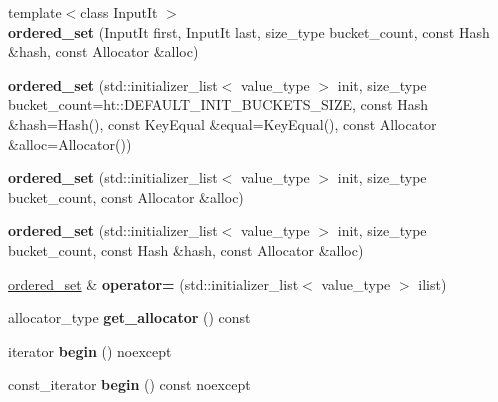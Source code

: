 \begin{DoxyCompactItemize}
{\footnotesize template$<$class Input\+It $>$ }\\{\bfseries ordered\+\_\+set} (Input\+It first, Input\+It last, size\+\_\+type bucket\+\_\+count, const Hash \&hash, const Allocator \&alloc)
\item 
\mbox{\label{classtsl_1_1ordered__set_af15847bafa2827f9558ff3113ce3c047}} 
{\bfseries ordered\+\_\+set} (std\+::initializer\+\_\+list$<$ value\+\_\+type $>$ init, size\+\_\+type bucket\+\_\+count=ht\+::\+D\+E\+F\+A\+U\+L\+T\+\_\+\+I\+N\+I\+T\+\_\+\+B\+U\+C\+K\+E\+T\+S\+\_\+\+S\+I\+ZE, const Hash \&hash=Hash(), const Key\+Equal \&equal=Key\+Equal(), const Allocator \&alloc=Allocator())
\item 
\mbox{\label{classtsl_1_1ordered__set_a3756674af513e07365ea58a4307ea068}} 
{\bfseries ordered\+\_\+set} (std\+::initializer\+\_\+list$<$ value\+\_\+type $>$ init, size\+\_\+type bucket\+\_\+count, const Allocator \&alloc)
\item 
\mbox{\label{classtsl_1_1ordered__set_a4ada7c8348ee664b0c8d51c241ce3c82}} 
{\bfseries ordered\+\_\+set} (std\+::initializer\+\_\+list$<$ value\+\_\+type $>$ init, size\+\_\+type bucket\+\_\+count, const Hash \&hash, const Allocator \&alloc)
\item 
\mbox{\label{classtsl_1_1ordered__set_a4e545a2e1c9252da9aafd3b8d9027996}} 
\mbox{\hyperlink{classtsl_1_1ordered__set}{ordered\+\_\+set}} \& {\bfseries operator=} (std\+::initializer\+\_\+list$<$ value\+\_\+type $>$ ilist)
\item 
\mbox{\label{classtsl_1_1ordered__set_a43ee92e0575ea5eda52000fa7359e19a}} 
allocator\+\_\+type {\bfseries get\+\_\+allocator} () const
\item 
\mbox{\label{classtsl_1_1ordered__set_a13854981a0a6dcf3caa8681249c8a2a6}} 
iterator {\bfseries begin} () noexcept
\item 
\mbox{\label{classtsl_1_1ordered__set_a8bcc4e4dd0290e5e95ac5581a90877d7}} 
const\+\_\+iterator {\bfseries begin} () const noexcept
\item 
\mbox{\label{classtsl_1_1ordered__set_a10355d72c3d4c1ab5c3995612239f40f}} 

\end{DoxyCompactItemize}
